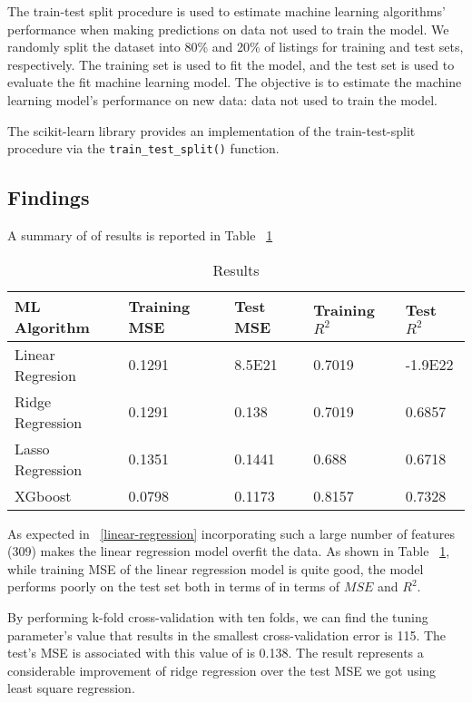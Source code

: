 The train-test split procedure is used to estimate machine learning algorithms'
performance when making predictions on data not used to train the model.  We
randomly split the dataset into 80\% and 20\% of listings for training and test
sets, respectively. The training set is used to fit the model, and the test
set is used to evaluate the fit machine learning model. The objective is to
estimate the machine learning model's performance on new data: data not used to
train the model.

The scikit-learn library provides an implementation of the train-test-split
procedure via the \texttt{train\_test\_split()} function.

\subsection{Findings}
\label{sec:findings}

A summary of of results is reported in Table ~\ref{tab:results}

\begin{table}[!htbp]
  \centering
  \caption{Results}
  \label{tab:results}
  \begin{tabular}{lllll}
    \hline
    ML Algorithm & Training MSE & Test MSE & Training $R^2$ & Test $R^2$ \\
    \hline
    Linear Regresion & 0.1291 &  8.5E21 &  0.7019 & -1.9E22 \\
    Ridge Regression  & 0.1291 & 0.138 & 0.7019 &  0.6857 \\
    Lasso Regression & 0.1351 & 0.1441 & 0.688 & 0.6718 \\
    XGboost &  0.0798 & 0.1173 & 0.8157 &  0.7328 \\
  \end{tabular}
\end{table}


As expected in ~\ref{linear-regression} incorporating such a large number
of features (309) makes the linear regression model overfit the data. As
shown in Table ~\ref{tab:results}, while training MSE of the linear regression
model is quite good, the model performs poorly on the test set both in terms of
in terms of $MSE$ and $R^2$.

By performing k-fold cross-validation with ten folds, we can find the tuning
parameter's value that results in the smallest cross-validation error is 115.
The test's MSE is associated with this value of  is 0.138.  The result
represents a considerable improvement of ridge regression over the test MSE we
got using least square regression.


